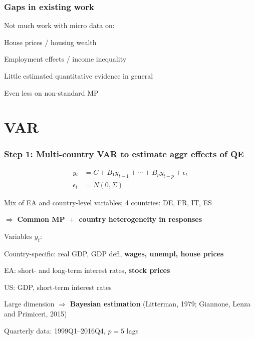 \documentclass[pdflatex,aspectratio=169]{beamer}
\newcommand{\jemph}[1]{{\color{StataDarkBlue}#1}}
\newcommand{\jbemph}[1]{\textbf{\color{SlideNavy}#1}}
\begin{document}
\begin{frame}\frametitle{\bf Gaps in existing work }
Not much work with micro data on:\\
\bi
\setlength{\itemsep}{2mm}
\item House prices / housing wealth
\item Employment effects / income inequality
\item Little estimated quantitative evidence in general
\item Even less on non-standard MP
\ei

\end{frame}


\section{VAR}
\begin{frame}\frametitle{\bf\large Step 1: Multi-country VAR to estimate aggr effects of QE}

\vspace*{-11.5mm}
\begin{align*}
y{_t}&=C+B{_1}  y_{t-1}+\cdots+B{_p}  y_{t-p}+\epsilon_{t}\\
\epsilon_{t}&=N(0,\Sigma)
\end{align*}
\vspace*{-7.5mm}
\bi
\setlength{\itemsep}{2mm}
\item Mix of EA and country-level variables; \jemph{4 countries: DE, FR, IT, ES}
\item $\Rightarrow$ \jbemph{Common MP ${}+{}$ country heterogeneity in responses}
\item Variables $y_t$:
\bi
\item \jemph{Country-specific:} real GDP, GDP defl, \jbemph{wages, unempl, house prices}
\item \jemph{EA:} short- and long-term interest rates, \jbemph{stock prices}
\item \jemph{US:} GDP, short-term interest rates
\ei
\item Large dimension $\Rightarrow$ \jbemph{Bayesian estimation} (Litterman, 1979; Giannone, Lenza and Primiceri, 2015)
\item Quarterly data: 1999Q1--2016Q4, $p=5$ lags
\ei
\end{frame}
\end{document}
